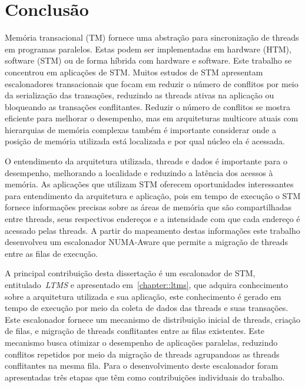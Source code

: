 \documentclass[diss,capa]{texufpel}
\begin{document}


\chapter{Conclusão}
\label{chapter::conclusao}

Memória transacional (TM) fornece uma abstração para sincronização de threads em programas paralelos. Estas podem ser implementadas em hardware (HTM), software (STM) ou de forma híbrida com hardware e software. Este trabalho se concentrou em aplicações de STM. Muitos estudos de STM apresentam escalonadores transacionais que focam em reduzir o número de conflitos por meio da serialização das transações, reduzindo as threads ativas na aplicação ou bloqueando as transações conflitantes. Reduzir o número de conflitos se mostra eficiente para melhorar o desempenho, mas em arquiteturas multicore atuais com hierarquias de memória complexas também é importante considerar onde a posição de memória utilizada está localizada e por qual núcleo ela é acessada.

O entendimento da arquitetura utilizada, threads e dados é importante para o desempenho, melhorando a localidade e reduzindo a latência dos acessos à memória. As aplicações que utilizam STM oferecem oportunidades interessantes para entendimento da arquitetura e aplicação, pois em tempo de execução o STM fornece informações precisas sobre as áreas de memória que são compartilhadas entre threads, seus respectivos endereços e a intensidade com que cada endereço é acessado pelas threads. A partir do mapeamento destas informações este trabalho desenvolveu um escalonador NUMA-Aware que permite a migração de threads entre as filas de execução.

A principal contribuição desta dissertação é um escalonador de STM, entitulado~\emph{LTMS} e apresentado em~\ref{chapter::ltms}, que adquira conhecimento sobre a arquitetura utilizada e sua aplicação, este conhecimento é gerado em tempo de execução por meio da coleta de dados das threads e suas transações. Este escalonador fornece um mecanismo de distribuição inicial de threads, criação de filas, e migração de threads conflitantes entre as filas existentes. Este mecanismo busca otimizar o desempenho de aplicações paralelas, reduzindo conflitos repetidos por meio da migração de threads agrupandoas as threads conflitantes na mesma fila. Para o desenvolvimento deste escalonador foram apresentadas três etapas que têm como contribuições individuais do trabalho.
\end{document}
